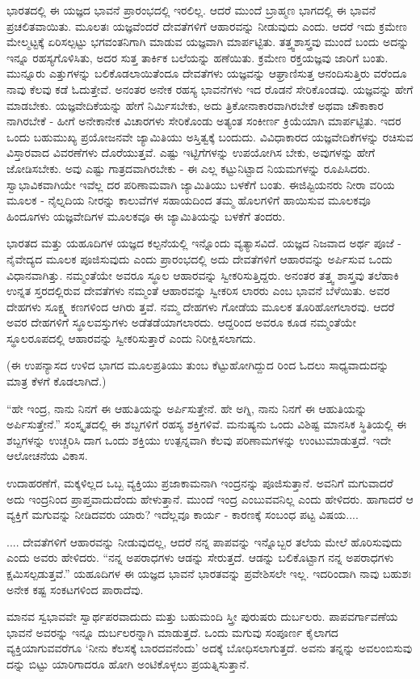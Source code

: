 ಭಾರತದಲ್ಲಿ ಈ ಯಜ್ಞದ ಭಾವನೆ ಪ್ರಾರಂಭದಲ್ಲಿ ಇರಲಿಲ್ಲ. ಆದರೆ ಮುಂದೆ ಬ್ರಾಹ್ಮಣ ಭಾಗದಲ್ಲಿ ಈ ಭಾವನೆ ಪ್ರಚಲಿತವಾಯಿತು. ಮೂಲತಃ ಯಜ್ಞವೆಂದರೆ ದೇವತೆಗಳಿಗೆ ಆಹಾರವನ್ನು ನೀಡುವುದು ಎಂದು. ಆದರೆ ಇದು ಕ್ರಮೇಣ ಮೇಲ್ಮಟ್ಟಕ್ಕೆ ಏರಿಸಲ್ಪಟ್ಟು ಭಗವಂತನಿಗಾಗಿ ಮಾಡುವ ಯಜ್ಞವಾಗಿ ಮಾರ್ಪಟ್ಟಿತು. ತತ್ತ್ವಶಾಸ್ತ್ರವು ಮುಂದೆ ಬಂದು ಅದನ್ನು ಇನ್ನೂ ರಹಸ್ಯಗೊಳಿಸಿತು, ಅದರ ಸುತ್ತ ತಾರ್ಕಿಕ ಬಲೆಯನ್ನು ಹಣೆಯಿತು. ಕ್ರಮೇಣ ರಕ್ತಯಜ್ಞವು ಜಾರಿಗೆ ಬಂತು. ಮುನ್ನೂರು ಎತ್ತುಗಳನ್ನು ಬಲಿಕೊಡಲಾಯಿತೆಂದೂ ದೇವತೆಗಳು ಯಜ್ಞವನ್ನು ಆಘ್ರಾಣಿಸುತ್ತ ಆನಂದಿಸುತ್ತಿರು ವರೆಂದೂ ನಾವು ಕೆಲವು ಕಡೆ ಓದುತ್ತೇವೆ. ಅನಂತರ ಅನೇಕ ರಹಸ್ಯ ಭಾವನೆಗಳು ಇದ ರೊಡನೆ ಸೇರಿಕೊಂಡವು. ಯಜ್ಞವನ್ನು ಹೇಗೆ ಮಾಡಬೇಕು. ಯಜ್ಞವೇದಿಕೆಯನ್ನು ಹೇಗೆ ನಿರ್ಮಿಸಬೇಕು, ಅದು ತ್ರಿಕೋನಾಕಾರವಾಗಿರಬೇಕೆ ಅಥವಾ ಚೌಕಾಕಾರ ನಾಗಿರಬೇಕೆ - ಹೀಗೆ ಅನೇಕಾನೇಕ ವಿಚಾರಗಳು ಸೇರಿಕೊಂಡು ಅತ್ಯಂತ ಸಂಕೀರ್ಣ ಕ್ರಿಯೆಯಾಗಿ ಮಾರ್ಪಟ್ಟಿತು. ಇದರ ಒಂದು ಬಹುಮುಖ್ಯ ಪ್ರಯೋಜನವೇ ಜ್ಯಾಮಿತಿಯು ಅಸ್ತಿತ್ವಕ್ಕೆ ಬಂದುದು. ವಿವಿಧಾಕಾರದ ಯಜ್ಞವೇದಿಕೆಗಳನ್ನು ರಚಿಸುವ ವಿಸ್ತಾರವಾದ ವಿವರಣೆಗಳು ದೊರೆಯುತ್ತವೆ. ಎಷ್ಟು ಇಟ್ಟಿಗೆಗಳನ್ನು ಉಪಯೋಗಿಸ ಬೇಕು, ಅವುಗಳನ್ನು ಹೇಗೆ ಜೋಡಿಸಬೇಕು. ಅವು ಎಷ್ಟು ಗಾತ್ರದವಾಗಿರಬೇಕು - ಈ ಎಲ್ಲ ಕಟ್ಟುನಿಟ್ಟಾದ ನಿಯಮಗಳನ್ನು ರೂಪಿಸಿದರು. ಸ್ವಾಭಾವಿಕವಾಗಿಯೇ ಇವೆಲ್ಲ ದರ ಪರಿಣಾಮವಾಗಿ ಜ್ಯಾಮಿತಿಯು ಬಳಕೆಗೆ ಬಂತು. ಈಜಿಪ್ಟಿಯನರು ನೀರಾ ವರಿಯ ಮೂಲಕ - ನೈಲ್ನದಿಯ ನೀರನ್ನು ಕಾಲುವೆಗಳ ಸಹಾಯದಿಂದ ತಮ್ಮ ಹೊಲಗಳಿಗೆ ಹಾಯಿಸುವ ಮೂಲಕವೂ ಹಿಂದೂಗಳು ಯಜ್ಞವೇದಿಗಳ ಮೂಲಕವೂ ಈ ಜ್ಯಾಮಿತಿಯನ್ನು ಬಳಕೆಗೆ ತಂದರು.

ಭಾರತದ ಮತ್ತು ಯಹೂದಿಗಳ ಯಜ್ಞದ ಕಲ್ಪನೆಯಲ್ಲಿ ಇನ್ನೊಂದು ವ್ಯತ್ಯಾಸವಿದೆ. ಯಜ್ಞದ ನಿಜವಾದ ಅರ್ಥ ಪೂಜೆ - ನೈವೇದ್ಯದ ಮೂಲಕ ಪೂಜಿಸುವುದು ಎಂದು ಪ್ರಾರಂಭದಲ್ಲಿ ಅದು ದೇವತೆಗಳಿಗೆ ಆಹಾರವನ್ನು ಅರ್ಪಿಸುವ ಒಂದು ವಿಧಾನವಾಗಿತ್ತು. ನಮ್ಮಂತೆಯೇ ಅವರೂ ಸ್ಥೂಲ ಆಹಾರವನ್ನು ಸ್ವೀಕರಿಸುತ್ತಿದ್ದರು. ಅನಂತರ ತತ್ತ್ವ ಶಾಸ್ತ್ರವು ತಲೆಹಾಕಿ ಉನ್ನತ ಸ್ತರದಲ್ಲಿರುವ ದೇವತೆಗಳು ನಮ್ಮಂತೆ ಆಹಾರವನ್ನು ಸ್ವೀಕರಿಸ ಲಾರರು ಎಂಬ ಭಾವನೆ ಬೆಳೆಯಿತು. ಅವರ ದೇಹಗಳು ಸೂಕ್ಷ್ಮ ಕಣಗಳಿಂದ ಆಗಿರು ತ್ತವೆ. ನಮ್ಮ ದೇಹಗಳು ಗೋಡೆಯ ಮೂಲಕ ತೂರಿಹೋಗಲಾರವು. ಆದರೆ ಅವರ ದೇಹಗಳಿಗೆ ಸ್ಥೂಲವಸ್ತುಗಳು ಅಡೆತಡೆಯಾಗಲಾರದು. ಆದ್ದರಿಂದ ಅವರೂ ಕೂಡ ನಮ್ಮಂತೆಯೇ ಸ್ಥೂಲರೂಪದಲ್ಲಿ ಆಹಾರವನ್ನು ಸ್ವೀಕರಿಸುತ್ತಾರೆ ಎಂದು ನಿರೀಕ್ಷಿಸಲಾಗದು.

(ಈ ಉಪನ್ಯಾಸದ ಉಳಿದ ಭಾಗದ ಮೂಲಪ್ರತಿಯು ತುಂಬ ಕೆಟ್ಟುಹೋಗಿದ್ದುದ ರಿಂದ ಓದಲು ಸಾಧ್ಯವಾದುದನ್ನು ಮಾತ್ರ ಕೆಳಗೆ ಕೊಡಲಾಗಿದೆ.)

“ಹೇ ಇಂದ್ರ, ನಾನು ನಿನಗೆ ಈ ಆಹುತಿಯನ್ನು ಅರ್ಪಿಸುತ್ತೇನೆ. ಹೇ ಅಗ್ನಿ, ನಾನು ನಿನಗೆ ಈ ಆಹುತಿಯನ್ನು ಅರ್ಪಿಸುತ್ತೇನೆ.” ಸಂಸ್ಕೃತದಲ್ಲಿ ಈ ಶಬ್ದಗಳಿಗೆ ರಹಸ್ಯ ಶಕ್ತಿಗಳಿವೆ. ಮನುಷ್ಯನು ಒಂದು ವಿಶಿಷ್ಟ ಮಾನಸಿಕ ಸ್ಥಿತಿಯಲ್ಲಿ ಈ ಶಬ್ದಗಳನ್ನು ಉಚ್ಚರಿಸಿ ದಾಗ ಒಂದು ಶಕ್ತಿಯು ಉತ್ಪನ್ನವಾಗಿ ಕೆಲವು ಪರಿಣಾಮಗಳನ್ನು ಉಂಟುಮಾಡುತ್ತದೆ. ಇದೇ ಆಲೋಚನೆಯ ವಿಕಾಸ.

ಉದಾಹರಣೆಗೆ, ಮಕ್ಕಳಿಲ್ಲದ ಒಬ್ಬ ವ್ಯಕ್ತಿಯು ಪ್ರಜಾಕಾಮನಾಗಿ ಇಂದ್ರನನ್ನು ಪೂಜಿಸುತ್ತಾನೆ. ಅವನಿಗೆ ಮಗುವಾದರೆ ಅದು ಇಂದ್ರನಿಂದ ಪ್ರಾಪ್ತವಾದುದೆಂದು ಹೇಳುತ್ತಾನೆ. ಮುಂದೆ ಇಂದ್ರ ಎಂಬುವವನಿಲ್ಲ ಎಂದು ಹೇಳಿದರು. ಹಾಗಾದರೆ ಆ ವ್ಯಕ್ತಿಗೆ ಮಗುವನ್ನು ನೀಡಿದವರು ಯಾರು? ಇದೆಲ್ಲವೂ ಕಾರ್ಯ - ಕಾರಣಕ್ಕೆ ಸಂಬಂಧ ಪಟ್ಟ ವಿಷಯ....

.... ದೇವತೆಗಳಿಗೆ ಆಹಾರವನ್ನು ನೀಡುವುದಲ್ಲ, ಆದರೆ ನನ್ನ ಪಾಪವನ್ನು ಇನ್ನೊಬ್ಬರ ತಲೆಯ ಮೇಲೆ ಹೊರಿಸುವುದು ಎಂದು ಅವರು ಹೇಳಿದರು. “ನನ್ನ ಅಪರಾಧಗಳು ಆಡನ್ನು ಸೇರುತ್ತದೆ. ಆಡನ್ನು ಬಲಿಕೊಟ್ಟಾಗ ನನ್ನ ಅಪರಾಧಗಳು ಕ್ಷಮಿಸಲ್ಪಡುತ್ತವೆ.” ಯಹೂದಿಗಳ ಈ ಯಜ್ಞದ ಭಾವನೆ ಭಾರತವನ್ನು ಪ್ರವೇಶಿಸಲೇ ಇಲ್ಲ. ಇದರಿಂದಾಗಿ ನಾವು ಬಹುಶಃ ಅನೇಕ ಕಷ್ಟ ಸಂಕಟಗಳಿಂದ ಪಾರಾದೆವು.

ಮಾನವ ಸ್ವಭಾವವೇ ಸ್ವಾರ್ಥಪರವಾದುದು ಮತ್ತು ಬಹುಮಂದಿ ಸ್ತ್ರೀ ಪುರುಷರು ದುರ್ಬಲರು. ಪಾಪವರ್ಗಾವಣೆಯ ಭಾವನೆ ಅವರನ್ನು ಇನ್ನೂ ದುರ್ಬಲರನ್ನಾಗಿ ಮಾಡುತ್ತದೆ. ಒಂದು ಮಗುವು ಸಂಪೂರ್ಣ ಕೈಲಾಗದ ವ್ಯಕ್ತಿಯಾಗುವವರೆಗೂ ‘ನೀನು ಕೆಲಸಕ್ಕೆ ಬಾರದವನೆಂದು’ ಅದಕ್ಕೆ ಬೋಧಿಸಲಾಗುತ್ತದೆ. ಅವನು ತನ್ನನ್ನು ಅವಲಂಬಿಸುವು ದನ್ನು ಬಿಟ್ಟು ಯಾರಿಗಾದರೂ ಹೋಗಿ ಅಂಟಿಕೊಳ್ಳಲು ಪ್ರಯತ್ನಿಸುತ್ತಾನೆ.


